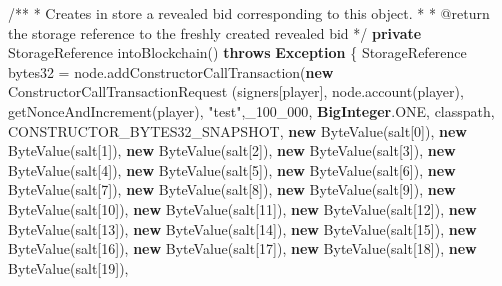 \documentclass[a4paper,]{book}
\newenvironment{Shaded}{\begin{snugshade}}{\end{snugshade}}
\newcommand{\AnnotationTok}[1]{\textcolor[rgb]{0.79,0.38,0.79}{#1}}
\newcommand{\BuiltInTok}[1]{\textcolor[rgb]{0.39,0.29,0.61}{\textbf{#1}}}
\newcommand{\CommentTok}[1]{\textcolor[rgb]{0.54,0.53,0.53}{#1}}
\newcommand{\DecValTok}[1]{\textcolor[rgb]{0.69,0.50,0.00}{#1}}
\newcommand{\FunctionTok}[1]{\textcolor[rgb]{0.39,0.29,0.61}{#1}}
\newcommand{\KeywordTok}[1]{\textcolor[rgb]{0.12,0.11,0.11}{\textbf{#1}}}
\newcommand{\NormalTok}[1]{\textcolor[rgb]{0.12,0.11,0.11}{#1}}
\newcommand{\StringTok}[1]{\textcolor[rgb]{0.75,0.01,0.01}{#1}}
\renewenvironment{Shaded}{\begin{snugshade}\small}{\end{snugshade}}
\begin{document}
{\begin{Shaded}
\begin{Highlighting}[]
    \CommentTok{/**}
     \CommentTok{*}\NormalTok{ Creates in store a revealed bid corresponding to this object}\CommentTok{.}
     \CommentTok{*} 
     \CommentTok{*} \AnnotationTok{@return }\NormalTok{the storage reference to the freshly created revealed bid}
     \CommentTok{*/}
    \KeywordTok{private}\NormalTok{ StorageReference }\FunctionTok{intoBlockchain}\NormalTok{() }\KeywordTok{throws} \BuiltInTok{Exception}\NormalTok{ \{}
\NormalTok{      StorageReference bytes32 = node.}\FunctionTok{addConstructorCallTransaction}\NormalTok{(}\KeywordTok{new}\NormalTok{ ConstructorCallTransactionRequest}
\NormalTok{        (signers[player], node.}\FunctionTok{account}\NormalTok{(player),}
        \FunctionTok{getNonceAndIncrement}\NormalTok{(player), }\StringTok{"test"}\NormalTok{,_}\DecValTok{100_000}\NormalTok{,}
        \BuiltInTok{BigInteger}\NormalTok{.}\FunctionTok{ONE}\NormalTok{, classpath, CONSTRUCTOR_BYTES32_SNAPSHOT,}
        \KeywordTok{new} \FunctionTok{ByteValue}\NormalTok{(salt[}\DecValTok{0}\NormalTok{]), }\KeywordTok{new} \FunctionTok{ByteValue}\NormalTok{(salt[}\DecValTok{1}\NormalTok{]), }\KeywordTok{new} \FunctionTok{ByteValue}\NormalTok{(salt[}\DecValTok{2}\NormalTok{]), }\KeywordTok{new} \FunctionTok{ByteValue}\NormalTok{(salt[}\DecValTok{3}\NormalTok{]),}
        \KeywordTok{new} \FunctionTok{ByteValue}\NormalTok{(salt[}\DecValTok{4}\NormalTok{]), }\KeywordTok{new} \FunctionTok{ByteValue}\NormalTok{(salt[}\DecValTok{5}\NormalTok{]), }\KeywordTok{new} \FunctionTok{ByteValue}\NormalTok{(salt[}\DecValTok{6}\NormalTok{]), }\KeywordTok{new} \FunctionTok{ByteValue}\NormalTok{(salt[}\DecValTok{7}\NormalTok{]),}
        \KeywordTok{new} \FunctionTok{ByteValue}\NormalTok{(salt[}\DecValTok{8}\NormalTok{]), }\KeywordTok{new} \FunctionTok{ByteValue}\NormalTok{(salt[}\DecValTok{9}\NormalTok{]), }\KeywordTok{new} \FunctionTok{ByteValue}\NormalTok{(salt[}\DecValTok{10}\NormalTok{]), }\KeywordTok{new} \FunctionTok{ByteValue}\NormalTok{(salt[}\DecValTok{11}\NormalTok{]),}
        \KeywordTok{new} \FunctionTok{ByteValue}\NormalTok{(salt[}\DecValTok{12}\NormalTok{]), }\KeywordTok{new} \FunctionTok{ByteValue}\NormalTok{(salt[}\DecValTok{13}\NormalTok{]), }\KeywordTok{new} \FunctionTok{ByteValue}\NormalTok{(salt[}\DecValTok{14}\NormalTok{]), }\KeywordTok{new} \FunctionTok{ByteValue}\NormalTok{(salt[}\DecValTok{15}\NormalTok{]),}
        \KeywordTok{new} \FunctionTok{ByteValue}\NormalTok{(salt[}\DecValTok{16}\NormalTok{]), }\KeywordTok{new} \FunctionTok{ByteValue}\NormalTok{(salt[}\DecValTok{17}\NormalTok{]), }\KeywordTok{new} \FunctionTok{ByteValue}\NormalTok{(salt[}\DecValTok{18}\NormalTok{]), }\KeywordTok{new} \FunctionTok{ByteValue}\NormalTok{(salt[}\DecValTok{19}\NormalTok{]),}

\end{Highlighting}
\end{Shaded}}
\end{document}
